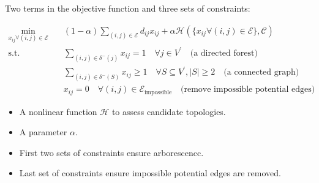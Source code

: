 \documentclass[
]{book}
\providecommand{\tightlist}{%
  \setlength{\itemsep}{0pt}\setlength{\parskip}{0pt}}
\begin{document}
Two terms in the objective function and three sets of constraints:

\[
\begin{aligned}
  \min_{x_{i j} \forall (i, j) \in \mathcal{E}} \quad
    & (1 - \alpha) \sum_{(i, j) \in \mathcal{E}} d_{i j} x_{i j}
    + \alpha \mathcal{H}
    \left(\{x_{i j} \forall (i, j) \in \mathcal{E} \}, \mathcal{C} \right) \\
  \text{s.t.} \quad & \sum_{(i, j) \in \delta^{-}(j)} x_{i j} = 1
    \quad \forall j \in V^{\prime}
    \quad \text{(a directed forest)} \\
  & \sum_{(i, j) \in \delta^{-}(S)} x_{i j} \geq 1
    \quad \forall S \subseteq V^{\prime},|S| \geq 2
    \quad \text{(a connected graph)} \\
  & x_{i j} = 0
    \quad \forall (i, j) \in \mathcal{E}_\text{impossible}
    \quad \text{(remove impossible potential edges)}
\end{aligned}
\]

\begin{itemize}
\tightlist
\item
  A nonlinear function \(\mathcal{H}\) to assess candidate topologies.
\item
  A parameter \(\alpha\).
\item
  First two sets of constraints ensure arborescencc.
\item
  Last set of constraints ensure impossible potential edges are removed.
\end{itemize}

  
\end{document}
